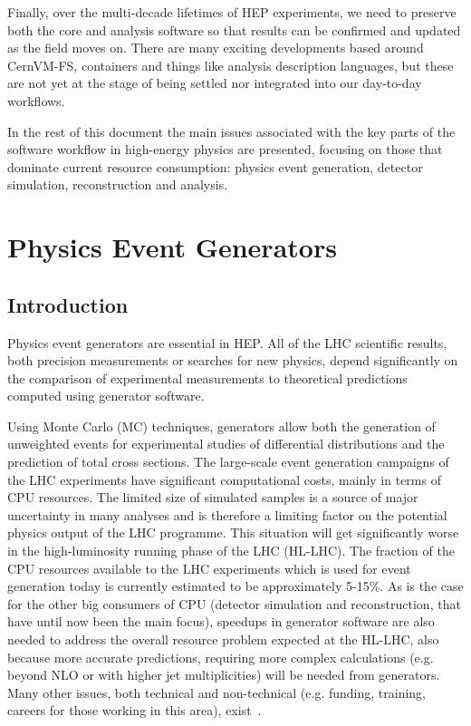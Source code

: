 \documentclass[11pt,a4paper]{article}
\begin{document}
Finally, over the multi-decade lifetimes of HEP experiments, we need to
preserve both the core and analysis software so that results can be
confirmed and updated as the field moves on. There are many exciting
developments based around CernVM-FS, containers and things like analysis
description languages, but these are not yet at the stage of being
settled nor integrated into our day-to-day workflows.

In the rest of this document the main issues associated with the key
parts of the software workflow in high-energy physics are presented,
focusing on those that dominate current resource consumption: physics
event generation, detector simulation, reconstruction and analysis.

\hypertarget{physics-event-generators}{%
\section{Physics Event Generators}\label{physics-event-generators}}

\hypertarget{introduction-1}{%
\subsection{Introduction}\label{introduction-1}}

Physics event generators are essential in HEP. All of the LHC scientific
results, both precision measurements or searches for new physics, depend
significantly on the comparison of experimental measurements to
theoretical predictions computed using generator software.

Using Monte Carlo (MC) techniques, generators allow both the generation
of unweighted events for experimental studies of differential
distributions and the prediction of total cross sections. The
large-scale event generation campaigns of the LHC experiments have
significant computational costs, mainly in terms of CPU resources. The
limited size of simulated samples is a source of major uncertainty in
many analyses and is therefore a limiting factor on the potential
physics output of the LHC programme. This situation will get
significantly worse in the high-luminosity running phase of the LHC
(HL-LHC). The fraction of the CPU resources available to the LHC
experiments which is used for event generation today is currently
estimated to be approximately 5-15\%. As is the case for the other big
consumers of CPU (detector simulation and reconstruction, that have
until now been the main focus), speedups in generator software are also
needed to address the overall resource problem expected at the HL-LHC,
also because more accurate predictions, requiring more complex
calculations (e.g. beyond NLO or with higher jet multiplicities) will be
needed from generators. Many other issues, both technical and
non-technical (e.g. funding, training, careers for those working in this
area), exist~\cite{Alves:2017she,Gen18}.
\end{document}
